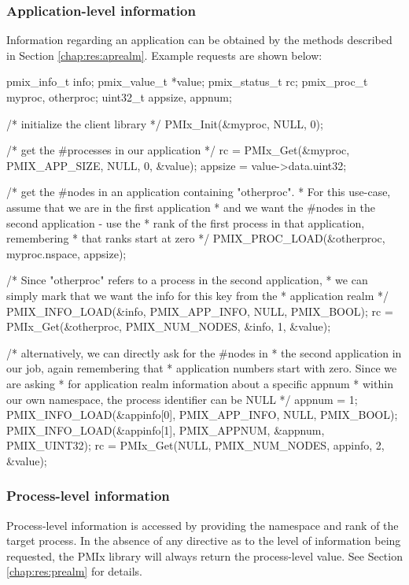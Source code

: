 \subsubsection{Application-level information}

Information regarding an application can be obtained by the methods described in Section \ref{chap:res:aprealm}. Example requests are shown below:

\cspecificstart
\begin{codepar}
pmix_info_t info;
pmix_value_t *value;
pmix_status_t rc;
pmix_proc_t myproc, otherproc;
uint32_t appsize, appnum;

/* initialize the client library */
PMIx_Init(&myproc, NULL, 0);

/* get the #processes in our application */
rc = PMIx_Get(&myproc, PMIX_APP_SIZE, NULL, 0, &value);
appsize = value->data.uint32;

/* get the #nodes in an application containing "otherproc".
 * For this use-case, assume that we are in the first application
 * and we want the #nodes in the second application - use the
 * rank of the first process in that application, remembering
 * that ranks start at zero */
PMIX_PROC_LOAD(&otherproc, myproc.nspace, appsize);

/* Since "otherproc" refers to a process in the second application,
 * we can simply mark that we want the info for this key from the
 * application realm */
PMIX_INFO_LOAD(&info, PMIX_APP_INFO, NULL, PMIX_BOOL);
rc = PMIx_Get(&otherproc, PMIX_NUM_NODES, &info, 1, &value);

/* alternatively, we can directly ask for the #nodes in
 * the second application in our job, again remembering that
 * application numbers start with zero. Since we are asking
 * for application realm information about a specific appnum
 * within our own namespace, the process identifier can be NULL */
appnum = 1;
PMIX_INFO_LOAD(&appinfo[0], PMIX_APP_INFO, NULL, PMIX_BOOL);
PMIX_INFO_LOAD(&appinfo[1], PMIX_APPNUM, &appnum, PMIX_UINT32);
rc = PMIx_Get(NULL, PMIX_NUM_NODES, appinfo, 2, &value);

\end{codepar}
\cspecificend

\subsubsection{Process-level information}

Process-level information is accessed by providing the namespace and rank of the target process. In the absence of any directive as to the level of information being requested, the \ac{PMIx} library will always return the process-level value. See Section \ref{chap:res:prealm} for details.

